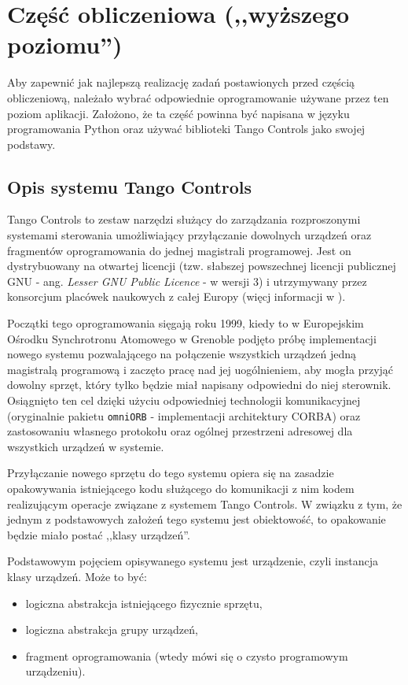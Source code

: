 \section{Część obliczeniowa (,,wyższego poziomu'')}
\label{sec:czesc-wyzsza}

Aby zapewnić jak najlepszą realizację zadań postawionych przed częścią obliczeniową, należało wybrać odpowiednie oprogramowanie używane przez ten poziom aplikacji. Założono, że ta część powinna być napisana w języku programowania Python oraz używać biblioteki Tango Controls jako swojej podstawy.


\subsection{Opis systemu Tango Controls}
\label{sub:czesc-wyzsza-tango}

Tango Controls to zestaw narzędzi służący do zarządzania rozproszonymi systemami sterowania umożliwiający przyłączanie dowolnych urządzeń oraz fragmentów oprogramowania do jednej magistrali programowej. Jest on dystrybuowany na otwartej licencji (tzw. słabszej powszechnej licencji publicznej GNU - ang. \emph{Lesser GNU Public Licence} - w wersji 3) i utrzymywany przez konsorcjum placówek naukowych z całej Europy (więcj informacji w \cite{TangoWebsite}).

Początki tego oprogramowania sięgają roku 1999, kiedy to w Europejskim Ośrodku Synchrotronu Atomowego w Grenoble podjęto próbę implementacji nowego systemu pozwalającego na połączenie wszystkich urządzeń jedną magistralą programową i zaczęto pracę nad jej uogólnieniem, aby mogła przyjąć dowolny sprzęt, który tylko będzie miał napisany odpowiedni do niej sterownik. Osiągnięto ten cel dzięki użyciu odpowiedniej technologii komunikacyjnej (oryginalnie pakietu \texttt{omniORB} - implementacji architektury CORBA) oraz zastosowaniu własnego protokołu oraz ogólnej przestrzeni adresowej dla wszystkich urządzeń w systemie.

Przyłączanie nowego sprzętu do tego systemu opiera się na zasadzie opakowywania istniejącego kodu służącego do komunikacji z nim kodem realizującym operacje związane z systemem Tango Controls. W związku z tym, że jednym z podstawowych założeń tego systemu jest obiektowość, to opakowanie będzie miało postać ,,klasy urządzeń''.

Podstawowym pojęciem opisywanego systemu jest urządzenie, czyli instancja klasy urządzeń. Może to być:
\begin{itemize}
    \item logiczna abstrakcja istniejącego fizycznie sprzętu,
    \item logiczna abstrakcja grupy urządzeń,
    \item fragment oprogramowania (wtedy mówi się o czysto programowym urządzeniu).
\end{itemize}


